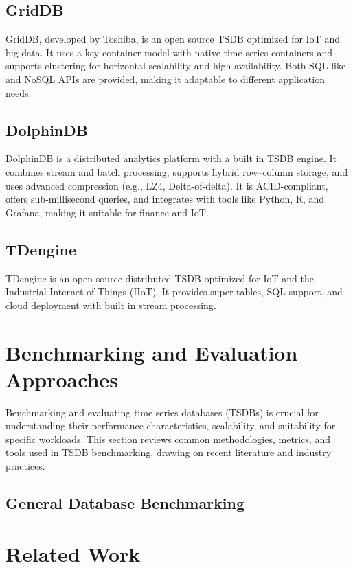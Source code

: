 \subsection{GridDB} GridDB, developed by Toshiba, is an open source TSDB
optimized for IoT and big data. It uses a key container model with native
time series containers and supports clustering for horizontal scalability and
high availability. Both SQL like and NoSQL APIs are provided, making it
adaptable to different application needs\cite{griddbDocs}.

\subsection{DolphinDB} DolphinDB is a distributed analytics platform with a
built in TSDB engine. It combines stream and batch processing, supports hybrid
row–column storage, and uses advanced compression (e.g., LZ4, Delta-of-delta).
It is ACID-compliant, offers sub-millisecond queries, and integrates with tools
like Python, R, and Grafana, making it suitable for finance and
IoT\cite{dolphindbDocs}.

\subsection{TDengine} TDengine is an open source distributed TSDB optimized for
IoT and the Industrial Internet of Things (IIoT). It provides super tables, SQL
support, and cloud deployment with built in stream
processing\cite{tdengineDocs}.

\section{Benchmarking and Evaluation
  Approaches}\label{sec:benchmarking-and-evaluation-approaches}

Benchmarking and evaluating time series databases (TSDBs) is crucial for
understanding their performance characteristics, scalability, and suitability
for specific workloads. This section reviews common methodologies, metrics, and
tools used in TSDB benchmarking, drawing on recent literature and industry
practices.

\newpage

\subsection{General Database Benchmarking}
\newpage

\section{Related Work}
\newpage